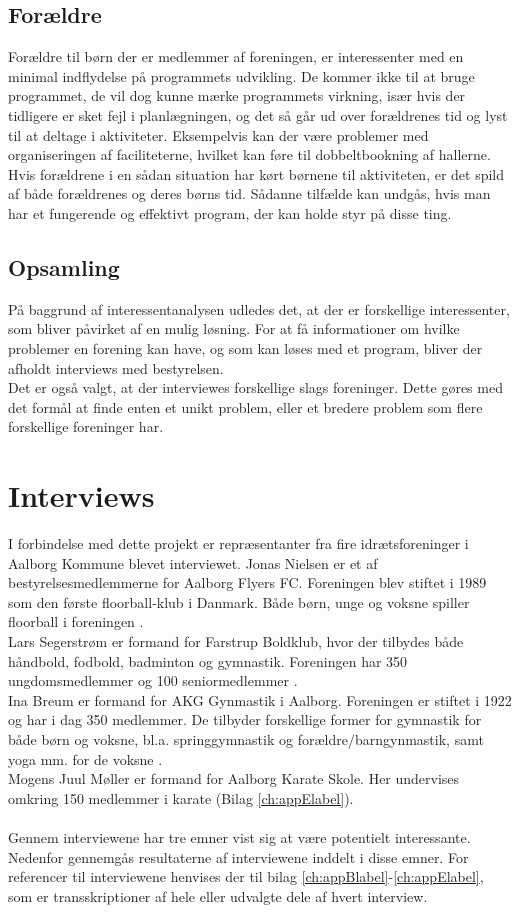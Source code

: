 \subsection*{Forældre}
Forældre til børn der er medlemmer af foreningen, er interessenter med en minimal indflydelse på programmets udvikling. De kommer ikke til at bruge programmet, de vil dog kunne mærke programmets virkning, især hvis der tidligere er sket fejl i planlægningen, og det så går ud over forældrenes tid og lyst til at deltage i aktiviteter. Eksempelvis kan der være problemer med organiseringen af faciliteterne, hvilket kan føre til dobbeltbookning af hallerne. Hvis forældrene i en sådan situation har kørt børnene til aktiviteten, er det spild af både forældrenes og deres børns tid. Sådanne tilfælde kan undgås, hvis man har et fungerende og effektivt program, der kan holde styr på disse ting.

\subsection*{Opsamling}
På baggrund af interessentanalysen udledes det, at der er forskellige interessenter, som bliver påvirket af en mulig løsning. For at få informationer om hvilke problemer en forening kan have, og som kan løses med et program, bliver der afholdt interviews med bestyrelsen. \\
Det er også valgt, at der interviewes forskellige slags foreninger. Dette gøres med det formål at finde enten et unikt problem, eller et bredere problem som flere forskellige foreninger har.\\

\section{Interviews}\label{Interviews}
I forbindelse med dette projekt er repræsentanter fra fire idrætsforeninger i Aalborg Kommune blevet interviewet. 
Jonas Nielsen er et af bestyrelsesmedlemmerne for Aalborg Flyers FC. Foreningen blev stiftet i 1989 som den første floorball-klub i Danmark. Både børn, unge og voksne spiller floorball i foreningen \citep{AalborgFlyers}.\\
Lars Segerstrøm er formand for Farstrup Boldklub, hvor der tilbydes både håndbold, fodbold, badminton og gymnastik. Foreningen har 350 ungdomsmedlemmer og 100 seniormedlemmer \citep{Farstrup}.\\ 
Ina Breum er formand for AKG Gynmastik i Aalborg. Foreningen er stiftet i 1922 og har i dag 350 medlemmer. De tilbyder forskellige former for gymnastik for både børn og voksne, bl.a. springgymnastik og forældre/barngynmastik, samt yoga mm. for de voksne \citep{AKG}.\\
Mogens Juul Møller er formand for Aalborg Karate Skole. Her undervises omkring 150 medlemmer i karate (Bilag \ref{ch:appElabel}). 
\\\\
Gennem interviewene har tre emner vist sig at være potentielt interessante. Nedenfor gennemgås resultaterne af interviewene inddelt i disse emner. For referencer til interviewene henvises der til bilag \ref{ch:appBlabel}-\ref{ch:appElabel}, som er transskriptioner af hele eller udvalgte dele af hvert interview.

